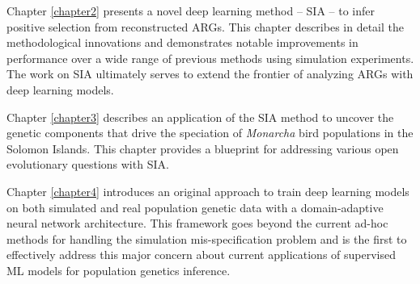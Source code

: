Chapter \ref{chapter2} presents a novel deep learning method -- \acs{SIA} -- to infer positive selection from reconstructed \acp{ARG}. This chapter describes in detail the methodological innovations and demonstrates notable improvements in performance over a wide range of previous methods using simulation experiments. The work on \ac{SIA} ultimately serves to extend the frontier of analyzing \acp{ARG} with deep learning models.

Chapter \ref{chapter3} describes an application of the \acs{SIA} method to uncover the genetic components that drive the speciation of \textit{Monarcha} bird populations in the Solomon Islands. This chapter provides a blueprint for addressing various open evolutionary questions with \acs{SIA}.

Chapter \ref{chapter4} introduces an original approach to train deep learning models on both simulated and real population genetic data with a domain-adaptive neural network architecture. This framework goes beyond the current ad-hoc methods for handling the simulation mis-specification problem and is the first to effectively address this major concern about current applications of supervised \ac{ML} models for population genetics inference.